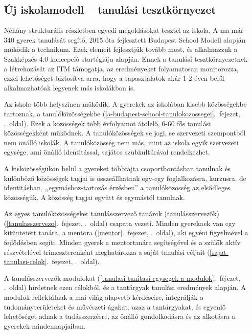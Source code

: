 \hypertarget{uj-iskolamodell-tanulasi-tesztkornyezet}{%
\subsection{Új iskolamodell -- tanulási
tesztkörnyezet}\label{uj-iskolamodell-tanulasi-tesztkornyezet}}

Néhány strukturális részletben egyedi megoldásokat tesztel az iskola. A
ma már 340 gyerek tanulását segítő, 2015 óta fejlesztett Budapest School
Modell alapján működik a technikum. Ezek elemeit fejlesztjük tovább
most, és alkalmazzuk a Szakképzés 4.0 koncepció startégiája alapján.
Ennek a tanulási tesztkörnyezetnek a létrehozását az ITM támogatja, az
eredményeket folyamatosan monitorozza, ezzel lehetőséget biztosítva
arra, hogy a tapasztalatok akár 1-2 éven belül alkalmazhatóak legyenek
más iskolákban is.

Az iskola több helyszínen működik. A gyerekek az iskolában kisebb
közösségekbe tartoznak, a
tanulóközösségekbe (\ref{a-budapest-school-tanulokozossegei}.~fejezet, \pageref{a-budapest-school-tanulokozossegei}.~oldal).
Ezek a közösségek több évfolyamot átölelő, 6-60 fős tanulási
közösségekként működnek. A tanulóközösségek se jogi, se szervezeti
szempontból nem önálló iskolák. A tanulóközösség nem más, mint az iskola
egyik szervezeti egysége, ami önálló identitással, sajátos
szubkultúrával rendelkezhet.

A kisközösségükön belül a gyereket többfajta csoportbontásban tanulnak
és különböző közösségek tagjai is összeállhatnak egy-egy foglalkozásra,
kurzusra, de identitásban, ,,egymáshoz-tartozás érzésben'' a
tanulóközösség az elsődleges közösségük. A közösség tagjai együtt és
egymástól tanulnak.

Az egyes tanulóközösségeket
tanulásszervező tanárok (tanulásszervezők) (\ref{tanulasszervezo}.~fejezet, \pageref{tanulasszervezo}.~oldal)
csapata vezeti. Minden gyereknek van egy kitüntetett tanára, a
mentora (\ref{mentor}.~fejezet, \pageref{mentor}.~oldal), aki egyéni
figyelmével a fejlődésben segíti. Minden gyerek a mentortanára
segítségével és a szülők aktív részvételével trimeszterenként
meghatározza a
saját tanulási céljait (\ref{sajat-tanulasi-celok}.~fejezet, \pageref{sajat-tanulasi-celok}.~oldal).

A tanulásszervezők
modulokat (\ref{tanulasi-tanitasi-egysegek-a-modulok}.~fejezet, \pageref{tanulasi-tanitasi-egysegek-a-modulok}.~oldal)
hirdetnek ezen célokból, és a tantárgyak tanulási eredmények alapján. A
modulok reflektálnak a mai világ alapvető kérdéseire, integrálják a
tudományterületeket és művészeti ágakat, azaz a tantárgyakat, és egyenlő
lehetőséget adnak a tudásszerzésre, az önálló gondolkodásra és az
alkotásra a gyerekek mindennapjaiban.

